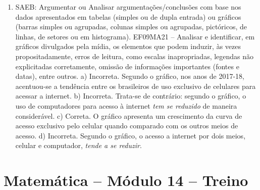 \begin{enumerate}
\item
SAEB: Argumentar ou Analisar argumentações/conclusões com base nos dados apresentados em tabelas (simples ou de dupla entrada) ou gráficos (barras simples ou agrupadas, colunas simples ou agrupadas, pictóricos, de linhas, de setores ou em histograma).
EF09MA21 -- Analisar e identificar, em gráficos divulgados pela mídia, os elementos que podem induzir, às vezes propositadamente, erros de leitura, como escalas inapropriadas, legendas não explicitadas corretamente, omissão de informações importantes (fontes e datas), entre outros.
a) Incorreta. Segundo o gráfico, nos anos de 2017-18, acentuou-se a tendência entre os
brasileiros de uso exclusivo de celulares para acessar a internet. 
b) Incorreta. Trata-se de contrário: segundo o gráfico, o uso de computadores para acesso
à internet \textit{tem se reduzido} de maneira considerável.
c) Correta. O gráfico apresenta um crescimento da curva de acesso exclusivo pelo
celular quando comparado com os outros meios de acesso.
d) Incorreta. Segundo o gráfico, o acesso a internet por dois meios, celular e computador,
\textit{tende a se reduzir}.
\end{enumerate}

\section*{Matemática – Módulo 14 – Treino}

